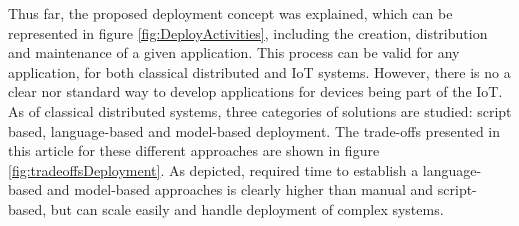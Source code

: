 Thus far, the proposed deployment concept was explained, which can be represented in figure \ref{fig:DeployActivities}, including the creation, distribution and maintenance of a given application.
This process can be valid for any application, for both classical distributed and IoT systems.
However, there is no a clear nor standard way to develop applications for devices being part of the IoT.
As of classical distributed systems, three categories of solutions are studied\cite{talwar2005approaches}: script based, language-based and model-based deployment.
The trade-offs presented in this article for these different approaches are shown in figure \ref{fig:tradeoffsDeployment}.
As depicted, required time to establish a language-based and model-based approaches is clearly higher than manual and script-based, but can scale easily and handle deployment of complex systems.
